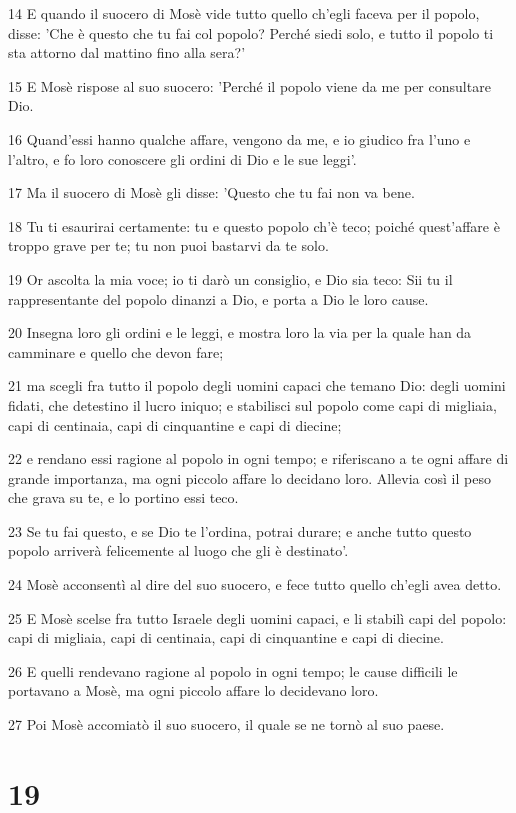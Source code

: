 \par 14 E quando il suocero di Mosè vide tutto quello ch'egli faceva per il popolo, disse: 'Che è questo che tu fai col popolo? Perché siedi solo, e tutto il popolo ti sta attorno dal mattino fino alla sera?'
\par 15 E Mosè rispose al suo suocero: 'Perché il popolo viene da me per consultare Dio.
\par 16 Quand'essi hanno qualche affare, vengono da me, e io giudico fra l'uno e l'altro, e fo loro conoscere gli ordini di Dio e le sue leggi'.
\par 17 Ma il suocero di Mosè gli disse: 'Questo che tu fai non va bene.
\par 18 Tu ti esaurirai certamente: tu e questo popolo ch'è teco; poiché quest'affare è troppo grave per te; tu non puoi bastarvi da te solo.
\par 19 Or ascolta la mia voce; io ti darò un consiglio, e Dio sia teco: Sii tu il rappresentante del popolo dinanzi a Dio, e porta a Dio le loro cause.
\par 20 Insegna loro gli ordini e le leggi, e mostra loro la via per la quale han da camminare e quello che devon fare;
\par 21 ma scegli fra tutto il popolo degli uomini capaci che temano Dio: degli uomini fidati, che detestino il lucro iniquo; e stabilisci sul popolo come capi di migliaia, capi di centinaia, capi di cinquantine e capi di diecine;
\par 22 e rendano essi ragione al popolo in ogni tempo; e riferiscano a te ogni affare di grande importanza, ma ogni piccolo affare lo decidano loro. Allevia così il peso che grava su te, e lo portino essi teco.
\par 23 Se tu fai questo, e se Dio te l'ordina, potrai durare; e anche tutto questo popolo arriverà felicemente al luogo che gli è destinato'.
\par 24 Mosè acconsentì al dire del suo suocero, e fece tutto quello ch'egli avea detto.
\par 25 E Mosè scelse fra tutto Israele degli uomini capaci, e li stabilì capi del popolo: capi di migliaia, capi di centinaia, capi di cinquantine e capi di diecine.
\par 26 E quelli rendevano ragione al popolo in ogni tempo; le cause difficili le portavano a Mosè, ma ogni piccolo affare lo decidevano loro.
\par 27 Poi Mosè accomiatò il suo suocero, il quale se ne tornò al suo paese.

\chapter{19}

